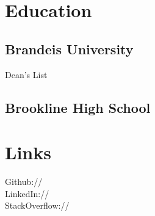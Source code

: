 \documentclass[]{deedy-resume-openfont}
\begin{document}
%
%
\lastupdated

%
%



%
%

\begin{minipage}[t]{0.33\textwidth} 


\section{Education} 

\subsection{Brandeis University}

Dean's List\\
\sectionsep

\subsection{Brookline High School}
\sectionsep


\section{Links} 
Github:// \href{https://github.com/}{} \\
LinkedIn://  \href{https://www.linkedin.com/in/}{} \\
StackOverflow://  \href{http://stackoverflow.com/users/2593964/}{} \\


\sectionsep


\end{minipage}
\end{document}

